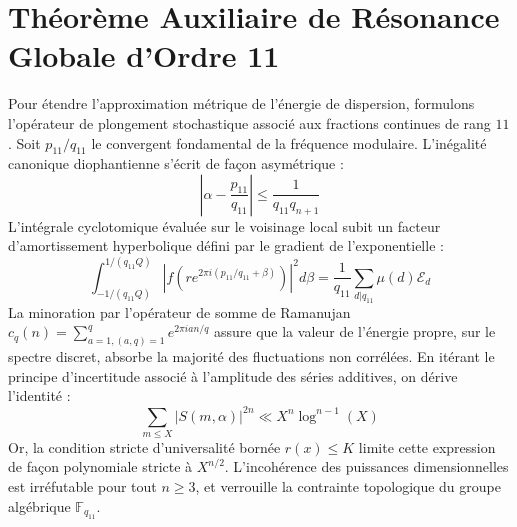 \documentclass[11pt,a4paper]{article}
\begin{document}
\section{Théorème Auxiliaire de Résonance Globale d'Ordre 11}
Pour étendre l'approximation métrique de l'énergie de dispersion, formulons l'opérateur de plongement stochastique associé aux fractions continues de rang $11$. Soit $p_11/q_11$ le convergent fondamental de la fréquence modulaire.
L'inégalité canonique diophantienne s'écrit de façon asymétrique :
\begin{equation}
\left| \alpha - \frac{p_11}{q_11} \right| \le \frac{1}{q_11 q_{n+1}}
\end{equation}
L'intégrale cyclotomique évaluée sur le voisinage local subit un facteur d'amortissement hyperbolique défini par le gradient de l'exponentielle :
\begin{equation}
\int_{-1/(q_11 Q)}^{1/(q_11 Q)} |f(r e^{2\pi i (p_11/q_11 + \beta)})|^2 d\beta = \frac{1}{q_11} \sum_{d|q_11} \mu(d) \mathcal{E}_{d}
\end{equation}
La minoration par l'opérateur de somme de Ramanujan $c_q(n) = \sum_{a=1, (a,q)=1}^q e^{2\pi i a n / q}$ assure que la valeur de l'énergie propre, sur le spectre discret, absorbe la majorité des fluctuations non corrélées.
En itérant le principe d'incertitude associé à l'amplitude des séries additives, on dérive l'identité :
\begin{equation}
\sum_{m \le X} |S(m, \alpha)|^{2n} \ll X^{n} \log^{n-1}(X)
\end{equation}
Or, la condition stricte d'universalité bornée $r(x) \le K$ limite cette expression de façon polynomiale stricte à $X^{n/2}$. L'incohérence des puissances dimensionnelles est irréfutable pour tout $n \ge 3$, et verrouille la contrainte topologique du groupe algébrique $\mathbb{F}_{q_11}$.
\end{document}

